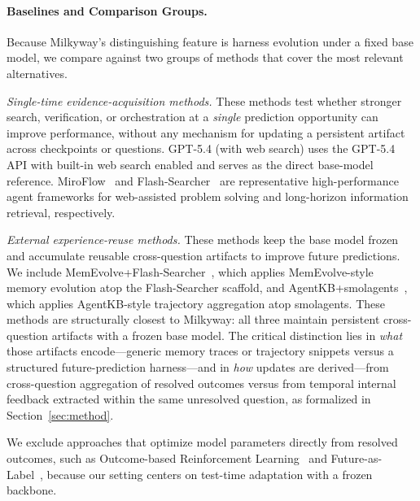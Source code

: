 \paragraph{Baselines and Comparison Groups.}
Because Milkyway's distinguishing feature is harness evolution under a fixed base model, we compare against two groups of methods that cover the most relevant alternatives.

\textit{Single-time evidence-acquisition methods.} These methods test whether stronger search, verification, or orchestration at a \emph{single} prediction opportunity can improve performance, without any mechanism for updating a persistent artifact across checkpoints or questions. GPT-5.4 (with web search) uses the GPT-5.4 API with built-in web search enabled and serves as the direct base-model reference. MiroFlow~\citep{su2026miroflow} and Flash-Searcher~\citep{qin2025flash} are representative high-performance agent frameworks for web-assisted problem solving and long-horizon information retrieval, respectively.

\textit{External experience-reuse methods.} These methods keep the base model frozen and accumulate reusable cross-question artifacts to improve future predictions. We include MemEvolve+Flash-Searcher~\citep{zhang2025memevolve,qin2025flash}, which applies MemEvolve-style memory evolution atop the Flash-Searcher scaffold, and AgentKB+smolagents~\citep{tang2025agent}, which applies AgentKB-style trajectory aggregation atop smolagents. These methods are structurally closest to Milkyway: all three maintain persistent cross-question artifacts with a frozen base model. The critical distinction lies in \emph{what} those artifacts encode---generic memory traces or trajectory snippets versus a structured future-prediction harness---and in \emph{how} updates are derived---from cross-question aggregation of resolved outcomes versus from temporal internal feedback extracted within the same unresolved question, as formalized in Section~\ref{sec:method}.

We exclude approaches that optimize model parameters directly from resolved outcomes, such as Outcome-based Reinforcement Learning~\citep{turtel2025outcome} and Future-as-Label~\citep{turtel2026future}, because our setting centers on test-time adaptation with a frozen backbone.

